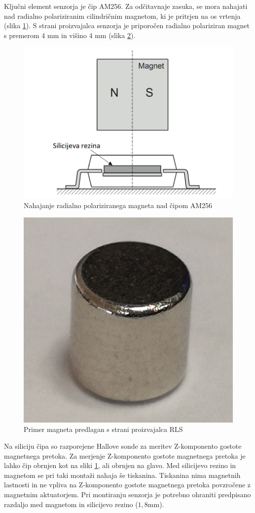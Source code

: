 Ključni element senzorja je čip AM256. Za odčitavnaje zasuka, se mora nahajati nad radialno polariziranim cilindričnim magnetom, ki je pritrjen na os vrtenja (slika \ref{stranski_ris}).
S strani proizvajalca senzorja je priporočen radialno polariziran magnet s premerom 4 mm in višino 4 mm (slika \ref{magnet4mm}).
\begin{figure}[ht]
	\centering
	\includegraphics[width=0.5\columnwidth]{./Slike/stranski_ris.png}
	\caption{Nahajanje radialno polariziranega magneta nad čipom AM256 \cite{AM8192}}
	\label{stranski_ris}
\end{figure}
\begin{figure}[ht]
	\centering
	\includegraphics[width=0.35\columnwidth]{./Slike/magnet4mm.png}
	\caption{Primer magneta predlagan s strani proizvajalca RLS}
	\label{magnet4mm}
\end{figure}

Na siliciju čipa so razporejene Hallove sonde za meritev Z-komponento gostote magnetnega pretoka. Za merjenje Z-komponento gostote magnetnega pretoka je lahko čip obrnjen kot na sliki \ref{stranski_ris}, ali
obrnjen na glavo. Med silicijevo rezino in magnetom se pri taki montaži nahaja še tiskanina. Tiskanina nima magnetnih lastnosti in ne vpliva na Z-komponento gostote magnetnega pretoka povzročene z magnetnim aktuatorjem. Pri montiranju senzorja je potrebno ohraniti predpisano
razdaljo med magnetom in silicijevo rezino ($1,8 \mathrm{mm}$).



